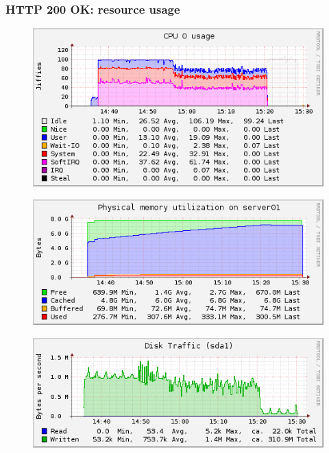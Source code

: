 \documentclass[Measurement results]{subfiles}
\begin{document}
\subsubsection{HTTP 200 OK: resource usage}
\label{sec:HTTP 200 OK baseline resource usage}
\begin{figure}[H]
\centering
\includegraphics[scale=0.7]{images/results/baseline_200/cpu.png}
\end{figure}

\begin{figure}[H]
\centering
\includegraphics[scale=0.7]{images/results/baseline_200/memory.png}
\end{figure}

\begin{figure}[H]
\centering
\includegraphics[scale=0.7]{images/results/baseline_200/disk.png}
\end{figure}
\end{document}
